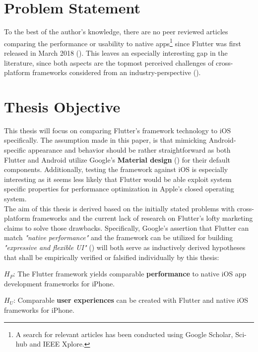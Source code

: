 \section{Problem Statement}
To the best of the author's knowledge, there are no peer reviewed articles comparing the performance or usability to native apps\footnote{A search for relevant articles has been conducted using Google Scholar, Sci-hub and IEEE Xplore.} since Flutter was first released in March 2018 (\cite{FlutterReleases2020}).
This leaves an especially interesting gap in the literature, since both aspects are the topmost perceived challenges of cross-platform frameworks considered from an industry-perspective (\cite{BioernHansen2019}).

\section{Thesis Objective} \label{section::thesis_objective}
This thesis will focus on comparing Flutter's framework technology to iOS specifically. The assumption made in this paper, is that mimicking Android-specific appearance and behavior should be rather straightforward as 
both Flutter and Android utilize Google's \textbf{Material design} (\cite{Google2021}) for their default components.
Additionally, testing the framework against iOS is especially interesting as it seems less likely that Flutter would be 
able exploit system specific properties for performance optimization in Apple's closed operating system.\\
The aim of this thesis is derived based on the initially stated problems with cross-platform frameworks and the current lack of research on Flutter's lofty marketing claims to solve those drawbacks.
Specifically, Google's assertion that Flutter can match \textit{"native performance"} and the framework can be utilized for building \textit{"expressive and flexible UI"} (\cite{FlutterDev20})
will both serve as inductively derived hypotheses that shall be empirically verified or falsified individually by this thesis:

\textbf{$H_P$}: The Flutter framework yields comparable \textbf{performance} to native iOS  app development frameworks for iPhone.

\textbf{$H_U$}: Comparable \textbf{user experiences} can be created with Flutter and native iOS frameworks for iPhone.


